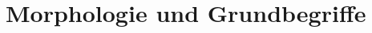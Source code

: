 \documentclass[handout,aspectratio=1610,dvipsnames]{beamer}
\begin{document}
  \section[Morphologie]{Morphologie und Grundbegriffe}
  \let\woopsi\section\let\section\subsection\let\subsection\subsubsection
  
  \let\subsection\section\let\section\woopsi
\end{document}
